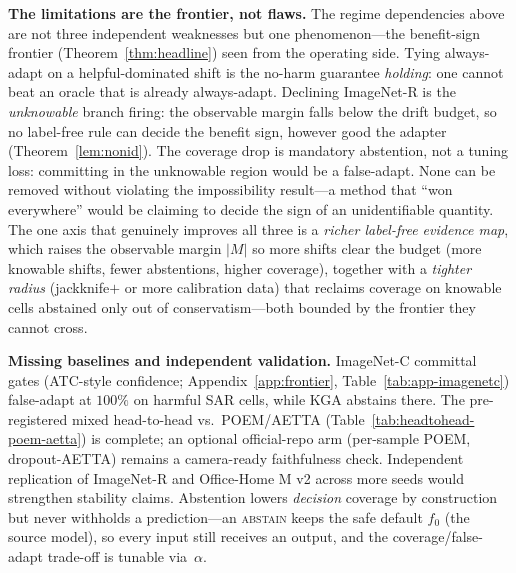 \documentclass[conference]{IEEEtran}
\theoremstyle{plain}
\theoremstyle{definition}
\theoremstyle{remark}
\begin{document}
\textbf{The limitations are the frontier, not flaws.} The regime dependencies above are not three
independent weaknesses but one phenomenon---the benefit-sign frontier (Theorem~\ref{thm:headline})
seen from the operating side. Tying always-adapt on a helpful-dominated shift is the no-harm
guarantee \emph{holding}: one cannot beat an oracle that is already always-adapt. Declining
ImageNet-R is the \emph{unknowable} branch firing: the observable margin falls below the drift
budget, so no label-free rule can decide the benefit sign, however good the adapter
(Theorem~\ref{lem:nonid}). The coverage drop is mandatory abstention, not a tuning loss: committing in
the unknowable region would be a false-adapt. None can be removed without violating the impossibility
result---a method that ``won everywhere'' would be claiming to decide the sign of an unidentifiable
quantity. The one axis that genuinely improves all three is a \emph{richer label-free evidence map},
which raises the observable margin $|M|$ so more shifts clear the budget (more knowable shifts, fewer
abstentions, higher coverage), together with a \emph{tighter radius} (jackknife$+$ or more
calibration data) that reclaims coverage on knowable cells abstained only out of conservatism---both
bounded by the frontier they cannot cross.

\textbf{Missing baselines and independent validation.} ImageNet-C committal gates
(ATC-style confidence; Appendix~\ref{app:frontier}, Table~\ref{tab:app-imagenetc}) false-adapt at
$100\%$ on harmful SAR cells, while \textsc{KGA} abstains there. The pre-registered mixed
head-to-head vs.\ POEM/AETTA (Table~\ref{tab:headtohead-poem-aetta}) is complete; an optional
official-repo arm (per-sample POEM, dropout-AETTA) remains a camera-ready faithfulness check.
Independent replication of ImageNet-R and Office-Home M v2 across more seeds would strengthen
stability claims. Abstention lowers \emph{decision} coverage by construction but never withholds a prediction---an \textsc{abstain} keeps the safe default $f_0$ (the source model), so every input still receives an output, and the coverage/false-adapt trade-off is tunable via~$\alpha$.

\begin{center}
\end{center}
\end{document}
